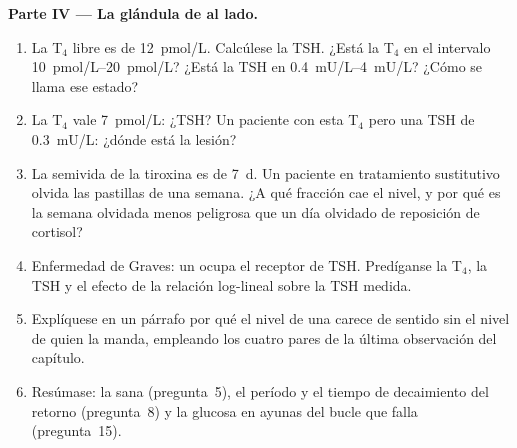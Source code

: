 \begin{problem}
\medskip
\noindent\textbf{Parte IV --- La glándula de al lado.}
\begin{enumerate}[resume]
  \item La T$_{4}$ libre es de \qty{12}{pmol/L}. Calcúlese la TSH. ¿Está
        la T$_{4}$ en el intervalo \qtyrange{10}{20}{pmol/L}? ¿Está la
        TSH en \qtyrange{0.4}{4}{mU/L}? ¿Cómo se llama ese estado?
  \item La T$_{4}$ vale \qty{7}{pmol/L}: ¿TSH? Un paciente con esta
        T$_{4}$ pero una TSH de \qty{0.3}{mU/L}: ¿dónde está la lesión?
  \item La semivida de la tiroxina es de \qty{7}{d}. Un paciente en
        tratamiento sustitutivo olvida las pastillas de una semana. ¿A
        qué fracción cae el nivel, y por qué es la semana olvidada menos
        peligrosa que un día olvidado de reposición de cortisol?
  \item Enfermedad de Graves: un  ocupa el receptor de TSH.
        Predíganse la T$_{4}$, la TSH y el efecto de la relación
        log-lineal sobre la TSH medida.
  \item Explíquese en un párrafo por qué el nivel de una  carece
        de sentido sin el nivel de quien la manda, empleando los cuatro
        pares de la última observación del capítulo.
  \item Resúmase: la  sana (pregunta~5), el período y
        el tiempo de decaimiento del retorno (pregunta~8) y la glucosa
        en ayunas del bucle que falla (pregunta~15).
\end{enumerate}
\end{problem}
